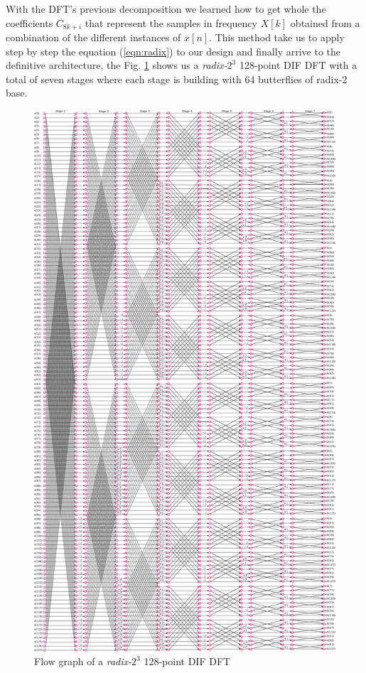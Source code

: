 \documentclass[journal,comsoc]{IEEEtran}
\begin{document}
With the DFT's previous decomposition we learned how to get whole the coefficients $C_{8k+i}$ that represent the samples in frequency $X[k]$ obtained from a combination of the different instances of $x[n]$. This method take us to apply step by step the equation (\ref{eqn:radix}) to our design and finally arrive to the definitive architecture, the Fig. \ref{fig:128puntosradix8conexion} shows us a \textit{radix-}$2^3$ 128-point DIF DFT with a total of seven stages where each stage is building with 64 butterflies of radix-2 base.

\begin{figure}[t!]
	\centering
	\includegraphics[width=\linewidth]{Diagramas/miSeccionFiguras/128PuntosRadix8Conexion.pdf}
	\caption{Flow graph of a \textit{radix-}$2^3$ 128-point DIF DFT}
	\label{fig:128puntosradix8conexion}
\end{figure}
\end{document}
